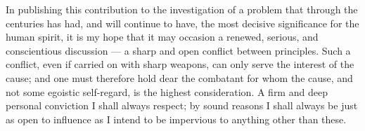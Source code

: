 \documentclass[12pt,a4paper]{article}
\begin{document}
In publishing this contribution to the investigation of a problem that
through the centuries has had, and will continue to have, the most
decisive significance for the human spirit, it is my hope that it may
occasion a renewed, serious, and conscientious discussion --- a sharp
and open conflict between principles. Such a conflict, even if carried
on with sharp weapons, can only serve the interest of the cause; and
one must therefore hold dear the combatant for whom the cause, and not
some egoistic self-regard, is the highest consideration. A firm and
deep personal conviction I shall always respect; by sound reasons I
shall always be just as open to influence as I intend to be impervious
to anything other than these.
\end{document}
